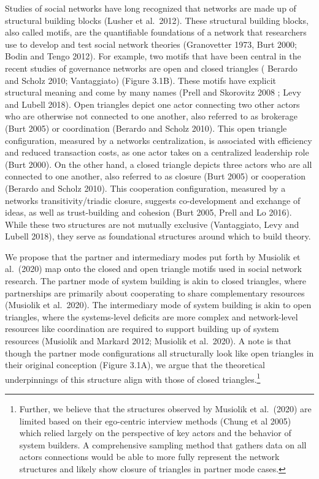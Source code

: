 \documentclass[twoside,12pt,final]{ucthesis-CA2012}
\begin{document}
\begin{ucmainmatter}
Studies of social networks have long recognized that networks are made
up of structural building blocks (Lusher et al.~2012). These structural
building blocks, also called motifs, are the quantifiable foundations of
a network that researchers use to develop and test social network
theories (Granovetter 1973, Burt 2000; Bodin and Tengo 2012). For
example, two motifs that have been central in the recent studies of
governance networks are open and closed triangles ( Berardo and Scholz
2010; Vantaggiato) (Figure 3.1B). These motifs have explicit structural
meaning and come by many names (Prell and Skorovitz 2008 ; Levy and
Lubell 2018). Open triangles depict one actor connecting two other
actors who are otherwise not connected to one another, also referred to
as brokerage (Burt 2005) or coordination (Berardo and Scholz 2010). This
open triangle configuration, measured by a network\textquotesingle s
\textquotesingle centralization\textquotesingle, is associated with efficiency and reduced
transaction costs, as one actor takes on a centralized leadership role
(Burt 2000). On the other hand, a closed triangle depicts three actors
who are all connected to one another, also referred to as closure (Burt
2005) or cooperation (Berardo and Scholz 2010). This cooperation
configuration, measured by a network\textquotesingle s \textquotesingle transitivity\textquotesingle/\textquotesingle triadic
closure\textquotesingle, suggests co-development and exchange of ideas, as well as
trust-building and cohesion (Burt 2005, Prell and Lo 2016). While these
two structures are not mutually exclusive (Vantaggiato, Levy and Lubell
2018), they serve as foundational structures around which to build
theory.

We propose that the partner and intermediary modes put forth by Musiolik
et al.~(2020) map onto the closed and open triangle motifs used in
social network research. The partner mode of system building is akin to
closed triangles, where partnerships are primarily about cooperating to
share complementary resources (Musiolik et al.~2020). The intermediary
mode of system building is akin to open triangles, where the
systems-level deficits are more complex and network-level resources like
coordination are required to support building up of system resources
(Musiolik and Markard 2012; Musiolik et al.~2020). A note is that though
the partner mode configurations all structurally look like open
triangles in their original conception (Figure 3.1A), we argue that the
theoretical underpinnings of this structure align with those of closed
triangles.\footnote{Further, we believe that the structures observed by Musiolik et
  al.~(2020) are limited based on their \textquotesingle ego-centric\textquotesingle{} interview
  methods (Chung et al 2005) which relied largely on the perspective
  of key actors and the behavior of system builders. A comprehensive
  sampling method that gathers data on all actors\textquotesingle{} connections would
  be able to more fully represent the network structures and likely
  show \textquotesingle closure\textquotesingle{} of triangles in partner mode cases.}


\end{ucmainmatter}
\end{document}
